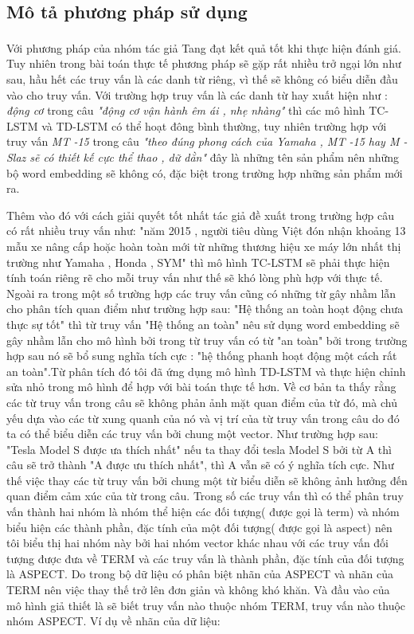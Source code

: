 \documentclass[fontsize=12pt]{scrartcl}
\begin{document}
\subsection{Mô tả phương pháp sử dụng}
Với phương pháp của nhóm tác giả Tang\textsuperscript{\cite{tang2015effective}} đạt kết quả tốt khi thực hiện đánh giá. Tuy nhiên trong bài toán thực tế phương pháp sẽ gặp rất nhiều trở ngại lớn như sau, hầu hết các truy vấn là các danh từ riêng, vì thế sẽ không có biểu diễn đầu vào cho truy vấn. Với trường hợp truy vấn là các danh từ hay xuất hiện như : \textit{động cơ} trong câu \textit{"động cơ vận hành êm ái , nhẹ nhàng"} thì các mô hình TC-LSTM và TD-LSTM có thể hoạt đông bình thường, tuy nhiên trường hợp với truy vấn \textit{MT -15} trong câu \textit{"theo đúng phong cách của Yamaha , MT -15 hay M - Slaz sẽ có thiết kế cực thể thao , dữ dằn"} đây là những tên sản phẩm nên những bộ word embedding sẽ không có, đặc biệt trong trường hợp những sản phẩm mới ra.
\par
Thêm vào đó với cách giải quyết tốt nhất tác giả đề xuất trong trường hợp câu có rất nhiều truy vấn như: "năm 2015 , người tiêu dùng Việt đón nhận khoảng 13 mẫu xe nâng cấp hoặc hoàn toàn mới từ những thương hiệu xe máy lớn nhất thị trường như Yamaha , Honda , SYM" thì mô hình TC-LSTM sẽ phải thực hiện tính toán riêng rẽ cho mỗi truy vấn như thế sẽ khó lòng phù hợp với thực tế. Ngoài ra trong một số trường hợp các truy vấn cũng có những từ gây nhầm lẫn cho phân tích quan điểm như trường hợp sau: "Hệ thống an toàn hoạt động chưa thực sự tốt" thì từ truy vấn "Hệ thống an toàn" nêu sử dụng word embedding sẽ gây nhầm lẫn cho mô hình bởi trong từ truy vấn có từ "an toàn" bởi trong trường hợp sau nó sẽ bổ sung nghĩa tích cực : "hệ thống phanh hoạt động một cách rất an toàn".Từ phân tích đó tôi đã ứng dụng mô hình TD-LSTM và thực hiện chỉnh sửa nhỏ trong mô hình để hợp với bài toán thực tế hơn. Về cơ bản ta thấy rằng các từ truy vấn trong câu sẽ không phản ảnh mặt quan điểm của từ đó, mà chủ yếu dựa vào các từ xung quanh của nó và vị trí của từ truy vấn trong câu do đó ta có thể biểu diễn các truy vấn bởi chung một vector. Như trường hợp sau: "Tesla Model S được ưa thích nhất" nếu ta thay đổi tesla Model S bởi từ A thì câu sẽ trở thành "A được ưu thích nhất", thì A vẫn sẽ có ý nghĩa tích cực. Như thế việc thay các từ truy vấn bởi chung một từ biểu diễn sẽ không ảnh hưởng đến quan điểm cảm xúc của từ trong câu. Trong số các truy vấn thì có thể phân truy vấn thành hai nhóm là nhóm thể hiện các đối tượng( được gọi là term) và nhóm biểu hiện các thành phần, đặc tính của một đối tượng( được gọi là aspect) nên tôi biểu thị hai nhóm này bởi hai nhóm vector khác nhau với các truy vấn đối tượng được đưa về TERM và các truy vấn là thành phần, đặc tính của đối tượng là ASPECT. Do trong bộ dữ liệu có phân biệt nhãn của ASPECT và nhãn của TERM nên việc thay thế trở lên đơn giản và không khó khăn. Và đầu vào của mô hình giả thiết là sẽ biết truy vấn nào thuộc nhóm TERM, truy vấn nào thuộc nhóm ASPECT. Ví dụ về nhãn của dữ liệu:\\
\end{document}
